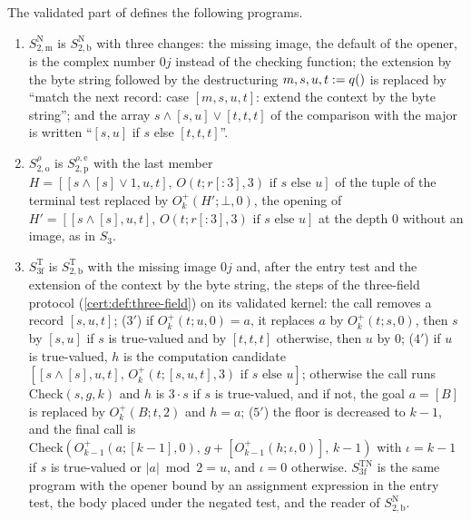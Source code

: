 The validated part of  defines the following programs.
\begin{enumerate}[label=(\roman*),start=4]
\item $S^{\mathrm N}_{2,\mathrm m}$ is $S^{\mathrm N}_{2,\mathrm b}$ with three
changes: the missing image, the default of the opener, is the complex number $0j$
instead of the checking function; the extension by the byte string followed by the
destructuring $m,s,u,t\mathrel{:=} q()$ is replaced by ``match the next record: case
$[m,s,u,t]$: extend the context by the byte string''; and the array
$s\land[s,u]\lor[t,t,t]$ of the comparison with the major is written ``$[s,u]$ if
$s$ else $[t,t,t]$''.
\item $S^{\rho}_{2,\mathrm o}$ is $S^{\rho,\mathrm e}_{2,\mathrm p}$ with the last
member $H=[[s\land[s]\lor 1,u,t],\,O(t;r[{:}3],3)\text{ if }s\text{ else }u]$ of the
tuple of the terminal test replaced by $O^{+}_k(H';\bot,0)$, the opening of
$H'=[[s\land[s],u,t],\,O(t;r[{:}3],3)\text{ if }s\text{ else }u]$ at the depth $0$
without an image, as in $S_3$.
\item $S^{\mathrm T}_{3\mathrm f}$ is $S^{\mathrm T}_{2,\mathrm b}$ with the missing
image $0j$ and, after the entry test and the extension of the context by the byte
string, the steps of the three-field protocol (\cref{cert:def:three-field}) on its
validated kernel: the call removes a record $[s,u,t]$; ($3'$) if
$O^{+}_k(t;u,0)=a$, it replaces $a$ by $O^{+}_k(t;s,0)$, then $s$ by $[s,u]$ if $s$
is true-valued and by $[t,t,t]$ otherwise, then $u$ by $0$; ($4'$) if $u$ is
true-valued, $h$ is the computation candidate
$[[s\land[s],u,t],\,O^{+}_k(t;[s,u,t],3)\text{ if }s\text{ else }u]$; otherwise the
call runs $\mathrm{Check}(s,g,k)$ and $h$ is $3\cdot s$ if $s$ is true-valued, and if
not, the goal $a=[B]$ is replaced by $O^{+}_k(B;t,2)$ and $h=a$; ($5'$) the floor is
decreased to $k-1$, and the final call is
$\mathrm{Check}(O^{+}_{k-1}(a;[k-1],0),\,g+[O^{+}_{k-1}(h;\iota,0)],\,k-1)$ with
$\iota=k-1$ if $s$ is true-valued or $\lvert a\rvert\bmod 2=u$, and $\iota=0$
otherwise. $S^{\mathrm{TN}}_{3\mathrm f}$ is the same program with the opener bound
by an assignment expression in the entry test, the body placed under the negated
test, and the reader of $S^{\mathrm N}_{2,\mathrm b}$.
\end{enumerate}

